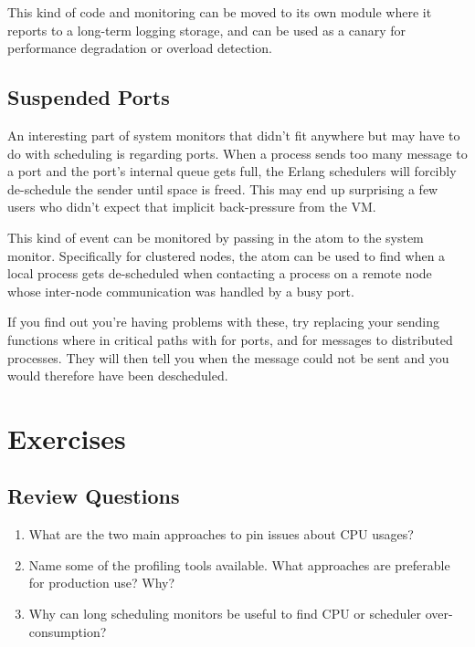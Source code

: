 \documentclass[11pt, oneside]{book}   	%
\begin{document}
This kind of code and monitoring can be moved to its own module where it reports to a long-term logging storage, and can be used as a canary for performance degradation or overload detection.

\subsection{Suspended Ports}
\label{subsec:port-system-monitors}

An interesting part of system monitors that didn't fit anywhere but may have to do with scheduling is regarding ports. When a process sends too many message to a port and the port's internal queue gets full, the Erlang schedulers will forcibly de-schedule the sender until space is freed. This may end up surprising a few users who didn't expect that implicit back-pressure from the VM.

This kind of event can be monitored by passing in the atom  to the system monitor. Specifically for clustered nodes, the atom  can be used to find when a local process gets de-scheduled when contacting a process on a remote node whose inter-node communication was handled by a busy port.

If you find out you're having problems with these, try replacing your sending functions where in critical paths with  for ports, and  for messages to distributed processes. They will then tell you when the message could not be sent and you would therefore have been descheduled.


\section{Exercises}

\subsection*{Review Questions}

\begin{enumerate}
	\item What are the two main approaches to pin issues about CPU usages?
	\item Name some of the profiling tools available. What approaches are preferable for production use? Why?
	\item Why can long scheduling monitors be useful to find CPU or scheduler over-consumption?

\end{enumerate}
\end{document}
